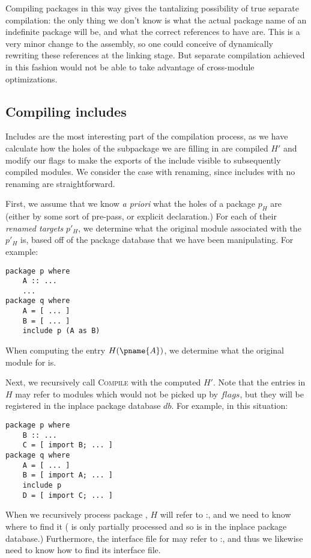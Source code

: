 \documentclass{article}
\begin{document}
Compiling packages in this way gives the tantalizing possibility
of true separate compilation: the only thing we don't know is what the actual
package name of an indefinite package will be, and what the correct references
to have are.  This is a very minor change to the assembly, so one could conceive
of dynamically rewriting these references at the linking stage.  But
separate compilation achieved in this fashion would not be able to take
advantage of cross-module optimizations.

\subsection{Compiling includes}

Includes are the most interesting part of the compilation process, as we have
calculate how the holes of the subpackage we are filling in are compiled $H'$
and modify our flags to make the exports of the include visible to subsequently
compiled modules.  We consider the case with renaming, since includes with
no renaming are straightforward.

First, we assume that we know \emph{a priori} what the holes of a
package $p_H$ are (either by some sort of pre-pass, or explicit
declaration.)  For each of their \emph{renamed targets} $p'_H$, we determine
what the original module associated with the $p'_H$ is, based off of
the package database that we have been manipulating.
For example:

\begin{verbatim}
package p where
    A :: ...
    ...
package q where
    A = [ ... ]
    B = [ ... ]
    include p (A as B)
\end{verbatim}

When computing the entry $H(\pname{A})$, we determine what the original
module for  is.

Next, we recursively call \textsc{Compile} with the computed $H'$.
Note that the entries in $H$ may refer to modules which would not be
picked up by $flags$, but they will be registered in the inplace
package database $db$.
For example, in this situation:

\begin{verbatim}
package p where
    B :: ...
    C = [ import B; ... ]
package q where
    A = [ ... ]
    B = [ import A; ... ]
    include p
    D = [ import C; ... ]
\end{verbatim}

When we recursively process package , $H$ will refer to
:, and we need to know where to find it ( is only
partially processed and so is in the inplace package database.)
Furthermore, the interface file for  may refer to :,
and thus we likewise need to know how to find its interface file.
\end{document}
